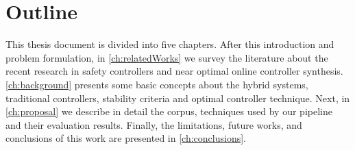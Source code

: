     \section{Outline}
    This thesis document is divided into five chapters. After this 
    introduction and problem formulation, in \autoref{ch:relatedWorks}
     we survey the literature about the recent research in safety
      controllers and near optimal online controller synthesis. 
    \autoref{ch:background} presents some basic concepts about the
    hybrid systems, traditional controllers,
    stability criteria and optimal controller technique. Next, in
    \autoref{ch:proposal} we describe in detail the corpus, 
    techniques used by our pipeline and their evaluation results. 
    Finally, the limitations, future works, and conclusions of this work are 
    presented in \autoref{ch:conclusions}.











